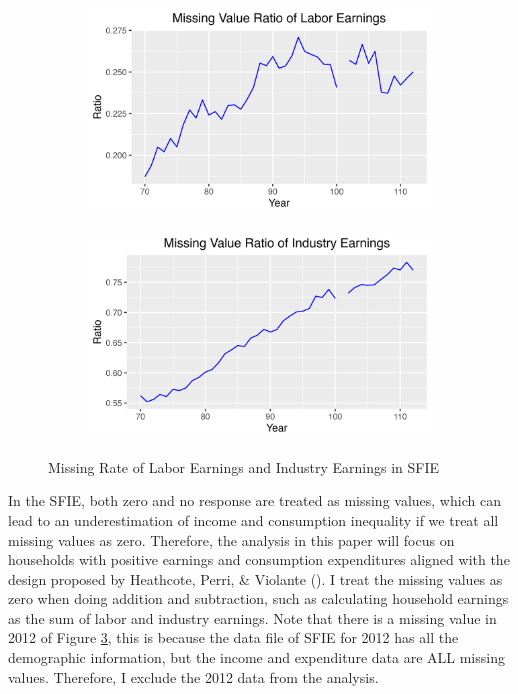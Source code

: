\documentclass{article}
\begin{document}
\begin{figure}
    \centering
    \begin{subfigure}[t]{0.475\textwidth}
        \centering
        \includegraphics[width=\textwidth]{figures/missing/itm190.png}
        \label{fig:missing_labor}
    \end{subfigure}
    \begin{subfigure}[t]{0.475\textwidth}
        \centering
        \includegraphics[width=\textwidth]{figures/missing/itm240.png}
        \label{fig:missing_industry}
    \end{subfigure}
    \caption{Missing Rate of Labor Earnings and Industry Earnings in SFIE}
    \label{fig:missing}
\end{figure}
In the SFIE, both zero and no response are treated as missing values, which can lead to an underestimation of income and consumption inequality if we treat all missing values as zero.
Therefore, the analysis in this paper will focus on households with positive earnings and consumption expenditures aligned with the design proposed by Heathcote, Perri, \& Violante (\citeyear{HEATHCOTE_2010}).
I treat the missing values as zero when doing addition and subtraction, such as calculating household earnings as the sum of labor and industry earnings.
Note that there is a missing value in 2012 of Figure \ref{fig:missing}, this is because the data file of SFIE for 2012 has all the demographic information, but the income and expenditure data are ALL missing values.
Therefore, I exclude the 2012 data from the analysis.
\end{document}
